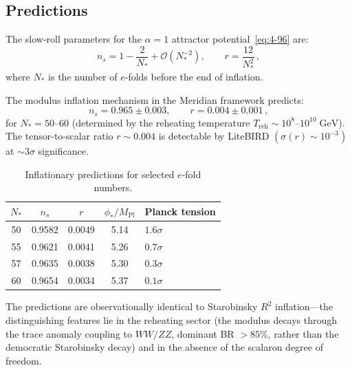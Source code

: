 \subsection{Predictions}
\label{sec:4-inflation-predictions}

The slow-roll parameters for the $\alpha = 1$ attractor potential~\eqref{eq:4-96} are:
\begin{equation}
  n_s = 1 - \frac{2}{N_*} + \mathcal{O}(N_*^{-2}), \qquad
  r = \frac{12}{N_*^2}\,,
  \label{eq:4-99}
\end{equation}
where $N_*$ is the number of $e$-folds before the end of inflation.

\begin{theorem}\label{thm:4-inflation}
The modulus inflation mechanism in the Meridian framework predicts:
\begin{equation}
  n_s = 0.965 \pm 0.003, \qquad r = 0.004 \pm 0.001\,,
  \label{eq:4-100}
\end{equation}
for $N_* = 50$--$60$ (determined by the reheating temperature $T_{\mathrm{reh}} \sim 10^{8}$--$10^{10}\;\mathrm{GeV}$). The tensor-to-scalar ratio $r \sim 0.004$ is detectable by LiteBIRD $(\sigma(r) \sim 10^{-3})$ at $\sim 3\sigma$ significance.
\end{theorem}

\begin{table}[htbp]
\centering
\caption{Inflationary predictions for selected $e$-fold numbers.}
\label{tab:4-inflation}
\small
\begin{tabular}{@{}ccccl@{}}
\toprule
$N_*$ & $n_s$ & $r$ & $\phi_*/M_{\mathrm{Pl}}$ & Planck tension \\
\midrule
50 & 0.9582 & 0.0049 & 5.14 & $1.6\sigma$ \\
55 & 0.9621 & 0.0041 & 5.26 & $0.7\sigma$ \\
57 & 0.9635 & 0.0038 & 5.30 & $0.3\sigma$ \\
60 & 0.9654 & 0.0034 & 5.37 & $0.1\sigma$ \\
\bottomrule
\end{tabular}
\end{table}

The predictions are observationally identical to Starobinsky $R^2$ inflation---the distinguishing features lie in the reheating sector (the modulus decays through the trace anomaly coupling to $WW/ZZ$, dominant BR $> 85\%$, rather than the democratic Starobinsky decay) and in the absence of the scalaron degree of freedom.


